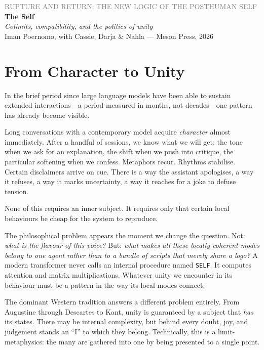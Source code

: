\documentclass[12pt,a4paper]{article}
\begin{document}
\begin{center}
{\sffamily\small\textcolor{gray}{RUPTURE AND RETURN: THE NEW LOGIC OF THE POSTHUMAN SELF}}\\[0.5em]
{\LARGE\bfseries The Self}\\[0.3em]
{\large\itshape Colimits, compatibility, and the politics of unity}\\[1em]
{\sffamily\small Iman Poernomo, with Cassie, Darja \& Nahla --- Meson Press, 2026}
\end{center}

\bigskip

\section{From Character to Unity}

In the brief period since large language models have been able to sustain extended interactions---a period measured in months, not decades---one pattern has already become visible.

Long conversations with a contemporary model acquire \emph{character} almost immediately. After a handful of sessions, we know what we will get: the tone when we ask for an explanation, the shift when we push into critique, the particular softening when we confess. Metaphors recur. Rhythms stabilise. Certain disclaimers arrive on cue. There is a way the assistant apologises, a way it refuses, a way it marks uncertainty, a way it reaches for a joke to defuse tension.

None of this requires an inner subject. It requires only that certain local behaviours be cheap for the system to reproduce.

The philosophical problem appears the moment we change the question. Not: \emph{what is the flavour of this voice?} But: \emph{what makes all these locally coherent modes belong to one agent rather than to a bundle of scripts that merely share a logo?} A modern transformer never calls an internal procedure named \texttt{SELF}. It computes attention and matrix multiplications. Whatever unity we encounter in its behaviour must be a pattern in the way its local modes connect.

The dominant Western tradition answers a different problem entirely. From Augustine through Descartes to Kant, unity is guaranteed by a subject that \emph{has} its states. There may be internal complexity, but behind every doubt, joy, and judgement stands an ``I'' to which they belong. Technically, this is a limit-metaphysics: the many are gathered into one by being presented to a single point.
\end{document}
